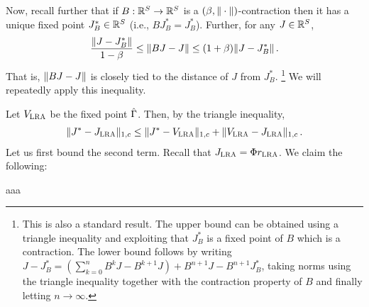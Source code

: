 Now, recall further that if $B:\mathbb{R}^S \to \mathbb{R}^S$ is a $(\beta,\|\cdot\|)$-contraction then it has a unique fixed point $J^*_B\in \mathbb{R}^S$ (i.e., $B J^*_B= J^*_B$). Further, for any $J\in \mathbb{R}^S$,
\begin{align}
\label{eq:csdw}
\frac{\norm{J-J^*_B}}{1-\beta} \le \norm{ BJ - J } \le (1+\beta) \norm{J-J^*_B}\,.
\end{align}
That is, $\|BJ-J\|$ is closely tied to the distance of $J$ from $J^*_B$.%
\footnote{This is also a standard result. The upper bound can be obtained using a triangle inequality and exploiting that $J^*_B$ is a fixed point of $B$ which is a contraction. The lower bound follows by writing $J - J^*_B = (\sum_{k=0}^n B^k J - B^{k+1} J ) + B^{n+1} J - B^{n+1} J^*_B$, taking norms using the triangle inequality together with the contraction property of $B$ and finally letting $n\to \infty$.}
We will repeatedly apply this inequality.

Let $V_{\text{\sc LRA}}$ be the fixed point $\hat{\Gamma}$.
Then, by the triangle inequality,
\begin{align*}
\|J^*-J_{\text{\sc LRA}}\|_{1,c} \le \|J^*-V_{\text{\sc LRA}}\|_{1,c} +\|V_{\text{\sc LRA}}-J_{\text{\sc LRA}}\|_{1,c}\,.
\end{align*}
Let us first bound the second term. Recall that $J_{\text{\sc LRA}} = \Phi r_{\text{\sc LRA}}$.
We claim the following:
\begin{lemma}
aaa
\end{lemma}

